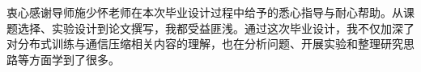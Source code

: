 \begin{acknowledgements}

衷心感谢导师施少怀老师在本次毕业设计过程中给予的悉心指导与耐心帮助。从课题选择、实验设计到论文撰写，我都受益匪浅。通过这次毕业设计，我不仅加深了对分布式训练与通信压缩相关内容的理解，也在分析问题、开展实验和整理研究思路等方面学到了很多。

\end{acknowledgements}
